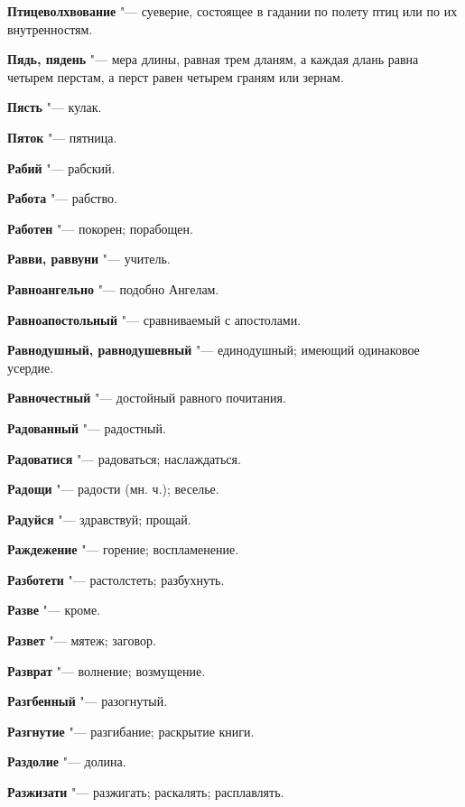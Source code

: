\begin{mymulticols}
\noindent\textbf{Птицеволхвование} "--- суеверие, состоящее в гадании по полету птиц или по их внутренностям. 

\noindent\textbf{Пядь, пядень} "--- мера длины, равная трем дланям, а каждая длань равна четырем перстам, а перст равен четырем граням или зернам. 

\noindent\textbf{Пясть} "--- кулак. 

\noindent\textbf{Пяток} "--- пятница. 

\bukvaending


\noindent\textbf{Рабий} "--- рабский. 

\noindent\textbf{Работа} "--- рабство. 

\noindent\textbf{Работен} "--- покорен; порабощен. 

\noindent\textbf{Равви, раввуни} "--- учитель. 

\noindent\textbf{Равноангельно} "--- подобно Ангелам. 

\noindent\textbf{Равноапостольный} "--- сравниваемый с апостолами. 

\noindent\textbf{Равнодушный, равнодушевный} "--- единодушный; имеющий одинаковое усердие. 

\noindent\textbf{Равночестный} "--- достойный равного почитания. 

\noindent\textbf{Радованный} "--- радостный. 

\noindent\textbf{Радоватися} "--- радоваться; наслаждаться. 

\noindent\textbf{Радощи} "--- радости (мн. ч.); веселье. 

\noindent\textbf{Радуйся} "--- здравствуй; прощай. 

\noindent\textbf{Раждежение} "--- горение; воспламенение. 

\noindent\textbf{Разботети} "--- растолстеть; разбухнуть. 

\noindent\textbf{Разве} "--- кроме. 

\noindent\textbf{Развет} "--- мятеж; заговор. 

\noindent\textbf{Разврат} "--- волнение; возмущение. 

\noindent\textbf{Разгбенный} "--- разогнутый. 

\noindent\textbf{Разгнутие} "--- разгибание; раскрытие книги. 

\noindent\textbf{Раздолие} "--- долина. 

\noindent\textbf{Разжизати} "--- разжигать; раскалять; расплавлять. 


\end{mymulticols}

